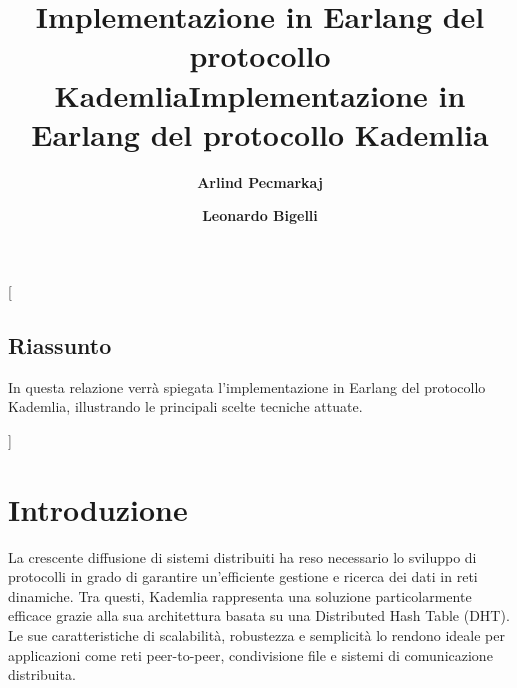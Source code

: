 \documentclass{article}
\title{\color{FireBrick}\bf{Implementazione in Earlang del protocollo Kademlia}}
\author[1]{\color{FireBrick}\bf{Arlind Pecmarkaj}}
\author[2]{\color{FireBrick}\bf{Leonardo Bigelli}}
\affil[1]{a.pecmarkaj@campus.uniurb.it}
\affil[2]{l.bigelli2@campus.uniurb.it}
\date{}
\begin{document}
{
}
\thispagestyle{firstpage}

\pagestyle{fancy}

\fancyhead{} %
\fancyhead[L]{\color{Black}{\footnotesize{\thetitle}}}
\fancyfoot{} %
\fancyfoot[R]{\footnotesize{\bf{\thepage}}}



\twocolumn
[{
\maketitle
\thispagestyle{firstpage}
\title{\color{Black}\bf{Implementazione in Earlang del protocollo Kademlia}}
\normalsize
\begin{tcolorbox}[  colback = WhiteSmoke,
                    ,
                    width=\linewidth,
                    arc=1mm, auto outer arc,
                ]
\section*{Riassunto}
In questa relazione verrà spiegata l'implementazione in Earlang del protocollo Kademlia, illustrando le principali scelte tecniche attuate.
\end{tcolorbox}
\vspace{1.5ex}
}]



\section{Introduzione}
La crescente diffusione di sistemi distribuiti ha reso necessario lo sviluppo di protocolli in grado di garantire un'efficiente gestione e ricerca dei dati in reti dinamiche. Tra questi, Kademlia rappresenta una soluzione particolarmente efficace grazie alla sua architettura basata su una Distributed Hash Table (DHT). Le sue caratteristiche di scalabilità, robustezza e semplicità lo rendono ideale per applicazioni come reti peer-to-peer, condivisione file e sistemi di comunicazione distribuita.
\end{document}
